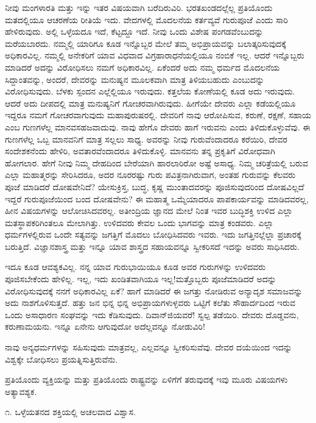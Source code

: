ನೀವು ಮಂಗಳಾರತಿ ಮತ್ತು ಇನ್ನು ಇತರ ವಿಷಯವಾಗಿ ಬರೆದಿರುವಿರಿ. ಭರತಖಂಡದಲ್ಲೆಲ್ಲ ಪ್ರತಿಯೊಂದು ಮತದಲ್ಲಿಯೂ ಆಚರಣೆಯ ರೀತಿಯೆ ಇದು. ವೇದಗಳಲ್ಲಿ ಮೊದಲನೆಯ ಕರ್ತವ್ಯವೆ ಗುರುಪೂಜೆ ಎಂದು ಸಾರಿ ಹೇಳಿರುವುದು. ಅಲ್ಲಿ ಒಳ್ಳೆಯದೂ ಇದೆ, ಕೆಟ್ಟದ್ದೂ ಇದೆ. ನೀವು ಒಂದು ವಿಶೇಷ ಪಂಗಡವೆಂಬುದನ್ನು ಮರೆಯಬಾರದು. ನಮ್ಮಲ್ಲಿ ಯಾರಿಗೂ ಕೂಡ ಇನ್ನೊಬ್ಬರ ಮೇಲೆ ತಮ್ಮ ಅಭಿಪ್ರಾಯವನ್ನು ಬಲಾತ್ಕರಿಸುವುದಕ್ಕೆ ಅಧಿಕಾರವಿಲ್ಲ. ನಮ್ಮಲ್ಲಿ ಅನೇಕರಿಗೆ ಯಾವ ವಿಧವಾದ ವಿಗ್ರಹಾರಾಧನೆಯಲ್ಲಿಯೂ ನಂಬಿಕೆ ಇಲ್ಲ. ಆದರೆ ಇನ್ನೊಬ್ಬರು ಮಾಡಿದರೆ ಅದನ್ನು ವಿರೋಧಿಸಲು ನಮಗೆ ಅಧಿಕಾರವಿಲ್ಲ. ಏಕೆಂದರೆ ಅದು ನಮ್ಮ ಧರ್ಮದ ಮೊದಲನೆಯ ಸಿದ್ದಾಂತವನ್ನು, ಅಂದರೆ, ದೇವರನ್ನು ಮನುಷ್ಯನ ಮೂಲಕವಾಗಿ ಮಾತ್ರ ತಿಳಿಯಬಹುದು ಎಂಬುದನ್ನು ವಿರೋಧಿಸುವುದು. ಬೆಳಕು ಸ್ಪಂದನ ಎಲ್ಲೆಲ್ಲಿಯೂ ಇರುವುದು. ಕತ್ತಲೆಯ ಕೋಣೆಯಲ್ಲಿ ಕೂಡ ಅದು ಇರುವುದು. ಆದರೆ ಅದು ದೀಪದಲ್ಲಿ ಮಾತ್ರ ಮನುಷ್ಯನಿಗೆ ಗೋಚರವಾಗಿರುವುದು. ಹೀಗೆಯೇ ದೇವರು ಎಲ್ಲಾ ಕಡೆಯಲ್ಲಿಯೂ ಇದ್ದರೂ ನಮಗೆ ಗೋಚರವಾಗುವುದು ಮಹಾಪುರುಷರಲ್ಲಿ. ದೇವರಿಗೆ ನಾವು ಆರೋಪಿಸುವ, ಕರುಣೆ, ರಕ್ಷಣೆ, ಸಹಾಯ ಎಂಬ ಗುಣಗಳೆಲ್ಲ ಮಾನವಸಹಜವಾದುವು. ನಾವು ಹೇಗೊ ದೇವರು ಹಾಗೆ ಇರುವನು ಎಂದು ತಿಳಿದುಕೊಳ್ಳುವೆವು. ಈ ಗುಣಗಳೆಲ್ಲ ಒಬ್ಬ ಮಾನವನಿಗೆ ಮಾತ್ರ ಸಲ್ಲಲು ಸಾಧ್ಯ. ಅವರನ್ನು ನೀವು ಗುರುವೆಂದಾದರೂ ಕರೆಯಿರಿ, ದೇವರ ಸಂದೇಶಕನೆಂದು ಹೇಳಿರಿ, ಅವತಾರವೆಂದಾದರೂ ತಿಳಿದುಕೊಳ್ಳಿ. ಮಾನವನು ತನ್ನ ಪ್ರಕೃತಿಗೆ ವಿರೋಧವಾಗಿ ಹೋಗಲಾರ. ಹೇಗೆ ನೀವು ನಿಮ್ಮ ದೇಹದಿಂದ ಬೇರೆಯಾಗಿ ಹಾರಲಾರಿರೋ ಅಷ್ಟೆ ಅಸಾಧ್ಯ. ನಿಮ್ಮ ಚರಿತ್ರೆಯಲ್ಲಿ ಬರುವ ಎಲ್ಲಾ ಮಹಾತ್ಮರನ್ನು ಸೇರಿಸಿದರೂ, ಅದರ ನೂರರಷ್ಟು ಗುರು ಪವಿತ್ರನಾಗಿರುವಾಗ, ಅಂತಹ ಗುರುವನ್ನು ಕೆಲವರು ಪೂಜೆ ಮಾಡಿದರೆ ದೋಷವೇನಿದೆ? ಯೇಸುಕ್ರಿಸ್ತ, ಬುದ್ಧ, ಕೃಷ್ಣ ಮುಂತಾದವರನ್ನು ಪೂಜಿಸುವುದರಿಂದ ದೋಷವಿಲ್ಲದೆ ಇದ್ದರೆ ಗುರುಪೂಜೆಯಿಂದ ಬಂದ ದೋಷವೇನು? ಈ ಮಹಾತ್ಮ ಒಮ್ಮೆಯಾದರೂ ಪಾಪಕಾರ್ಯವನ್ನು ಮಾಡಿದವರಲ್ಲ, ಹೀನ ವಿಷಯಗಳನ್ನು ಆಲೋಚಿಸಿದವರಲ್ಲ. ಅತೀಂದ್ರಿಯ ಜ್ಞಾನದ ಮೇಲೆ ನಿಂತ ಇವರ ಬುದ್ಧಿಶಕ್ತಿ ಉಳಿದ ಎಲ್ಲಾ ಮತಸ್ಥಾಪಕರಿಗಿಂತಲೂ ಮೇಲಾಗಿತ್ತು. ಉಳಿದವರು ಕೇವಲ ಒಂದು ಭಾಗವನ್ನು ಮಾತ್ರ ಕಂಡವರು. ಎಲ್ಲಾ ಧರ್ಮಗಳಲ್ಲಿರುವ ಒಂದೇ ಸತ್ಯವನ್ನು ಜಗತ್ತಿಗೆ ಮೊದಲು ಬೋಧಿಸಿದವರು ಇವರು. ಇದು ಜಗತ್ತಿನಲ್ಲೆಲ್ಲಾ ಪ್ರಚಾರಕ್ಕೆ ಬರುತ್ತಿದೆ. ವಿಜ್ಞಾನಶಾಸ್ತ್ರ ಮತ್ತು ಇನ್ನೂ ಯಾವ ಶಾಸ್ತ್ರದ ಸಹಾಯವನ್ನೂ ಸ್ವೀಕರಿಸದೆ ಇದನ್ನು ಅವರು ಸಾಧಿಸಿದರು.

ಇದೂ ಕೂಡ ಆವಶ್ಯಕವಿಲ್ಲ. ನನ್ನ ಯಾವ ಗುರುಭಾಯಿಯೂ ಕೂಡ ಅವರ ಗುರುಗಳನ್ನು ಉಳಿದವರು ಪೂಜಿಸಬೇಕೆಂದು ಹೇಳಿಲ್ಲ. ಇಲ್ಲ, ಇದು ಖಂಡಿತವಾಗಿಯೂ ಇಲ್ಲ!ಮತ್ತೊಬ್ಬರು ಪೂಜೆಮಾಡಿದರೆ ಅದನ್ನು ವಿರೋಧಿಸುವುದಕ್ಕೆ ನನಗೆ ಅಧಿಕಾರವಿಲ್ಲ ಏಕೆ? ಹಾಗೆ ಮಾಡಿದರೆ ಈ ಜಗತ್ತು ನೋಡಿರುವ ಅನ್ಯಾದೃಶ ಸಮಾಜವನ್ನು ಅದು ನಾಶಗೊಳಿಸುತ್ತದೆ. ಹತ್ತು ಜನ ಭಿನ್ನ ಭಿನ್ನ ಅಭಿಪ್ರಾಯಗಳುಳ್ಳವರು ಒಟ್ಟಿಗೆ ಕಲೆತು ಸೌಹಾರ್ದದಿಂದ ಇರುವ ಒಂದು ಅಸಾಧಾರಣ ಸಂಘವನ್ನು ಇದು ಕೆಡಿಸುವುದು. ದಿವಾನ್‌ಜಿಯವರೆ! ಸ್ವಲ್ಪ ತಡೆಯಿರಿ. ದೇವರು ದೊಡ್ಡವನು, ಕರುಣಾಮಯನು. ಇನ್ನೂ ಏನೇನು ಆಗುವುದೋ ಅದೆಲ್ಲವನ್ನೂ ನೋಡುವಿರಿ!

ನಾವು ಅನ್ಯಧರ್ಮಗಳನ್ನು ಸಹಿಸುವುದು ಮಾತ್ರವಲ್ಲ, ಎಲ್ಲವನ್ನೂ ಸ್ವೀಕರಿಸುವೆವು. ದೇವರ ದಯೆಯಿಂದ ಇದನ್ನು ವಿಶ್ವಕ್ಕೇ ಬೋಧಿಸಲು ಪ್ರಯತ್ನಿಸುತ್ತಿರುವೆನು.

ಪ್ರತಿಯೊಂದು ವ್ಯಕ್ತಿಯನ್ನು ಮತ್ತು ಪ್ರತಿಯೊಂದು ರಾಷ್ಟ್ರವನ್ನು ಏಳಿಗೆಗೆ ತರುವುದಕ್ಕೆ ಇವು ಮೂರು ವಿಷಯಗಳು ಅತ್ಯಾವಶ್ಯಕ.

೧. ಒಳ್ಳೆಯತನದ ಶಕ್ತಿಯಲ್ಲಿ ಅಚಲವಾದ ವಿಶ್ವಾಸ.

